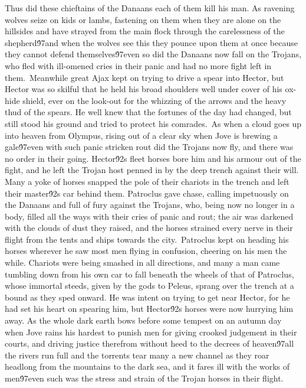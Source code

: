 {Thus did these chieftains of the Danaans each of them kill his man. As ravening wolves seize on kids or lambs, fastening on them when they are alone on the hillsides and have strayed from the main flock through the carelessness of the shepherd\'97and when the wolves see this they pounce upon them at once because they cannot defend themselves\'97even so did the Danaans now fall on the Trojans, who fled with ill-omened cries in their panic and had no more fight left in them.\
Meanwhile great Ajax kept on trying to drive a spear into Hector, but Hector was so skilful that he held his broad shoulders well under cover of his ox-hide shield, ever on the look-out for the whizzing of the arrows and the heavy thud of the spears. He well knew that the fortunes of the day had changed, but still stood his ground and tried to protect his comrades.\
As when a cloud goes up into heaven from Olympus, rising out of a clear sky when Jove is brewing a gale\'97even with such panic stricken rout did the Trojans now fly, and there was no order in their going. Hector\'92s fleet horses bore him and his armour out of the fight, and he left the Trojan host penned in by the deep trench against their will. Many a yoke of horses snapped the pole of their chariots in the trench and left their master\'92s car behind them. Patroclus gave chase, calling impetuously on the Danaans and full of fury against the Trojans, who, being now no longer in a body, filled all the ways with their cries of panic and rout; the air was darkened with the clouds of dust they raised, and the horses strained every nerve in their flight from the tents and ships towards the city.\
Patroclus kept on heading his horses wherever he saw most men flying in confusion, cheering on his men the while. Chariots were being smashed in all directions, and many a man came tumbling down from his own car to fall beneath the wheels of that of Patroclus, whose immortal steeds, given by the gods to Peleus, sprang over the trench at a bound as they sped onward. He was intent on trying to get near Hector, for he had set his heart on spearing him, but Hector\'92s horses were now hurrying him away. As the whole dark earth bows before some tempest on an autumn day when Jove rains his hardest to punish men for giving crooked judgement in their courts, and driving justice therefrom without heed to the decrees of heaven\'97all the rivers run full and the torrents tear many a new channel as they roar headlong from the mountains to the dark sea, and it fares ill with the works of men\'97even such was the stress and strain of the Trojan horses in their flight.\
}

